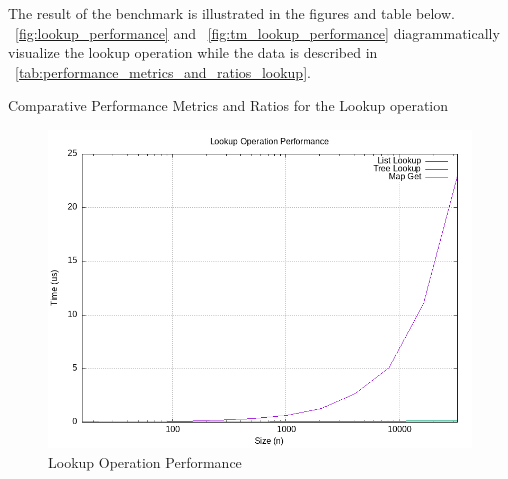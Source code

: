 \documentclass[a4paper,11pt]{article}
\begin{document}
The result of the benchmark is illustrated in the figures and table below.
~\autoref{fig:lookup_performance} and ~\autoref{fig:tm_lookup_performance}
diagrammatically visualize the lookup operation while the
data is described in ~\autoref{tab:performance_metrics_and_ratios_lookup}.

    \begin{table}[htbp]
        \centering
        \caption{Comparative Performance Metrics and Ratios for the Lookup operation}
        \label{tab:performance_metrics_and_ratios_lookup}
    \end{table}

    \begin{figure}[h]
        \centering
        \includegraphics[width=\textwidth]{../data/lookup_performance.png}
        \caption{Lookup Operation Performance}
        \label{fig:lookup_performance}
    \end{figure}
\end{document}

